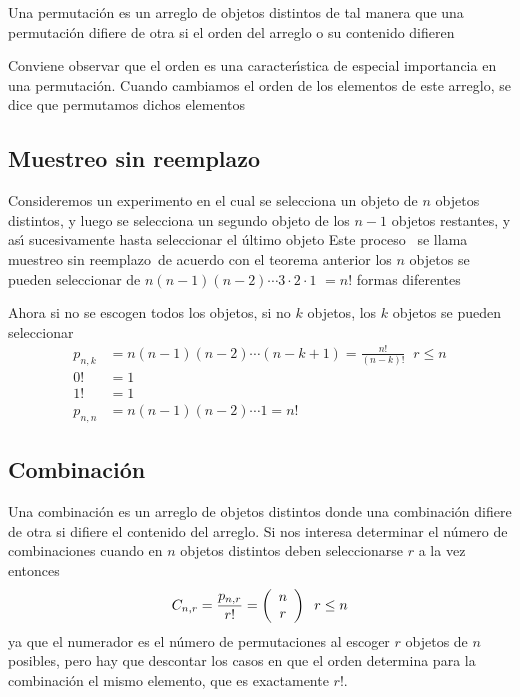 \begin{definition}
Una permutaci\'{o}n es un arreglo de objetos distintos de tal manera que una
permutaci\'{o}n difiere de otra si el orden del arreglo o su contenido
difieren
\end{definition} 

Conviene observar que el orden es una caracter\'{\i}stica de especial
importancia en una permutaci\'{o}n. Cuando cambiamos el orden de los elementos
de este arreglo, se dice que permutamos dichos elementos

\subsection{Muestreo sin reemplazo}

Consideremos un experimento en el cual se selecciona un objeto de $n$ objetos
distintos, y luego se selecciona un segundo objeto de los $n-1$ objetos
restantes, y as\'{\i} sucesivamente hasta seleccionar el \'{u}ltimo objeto
Este proceso \ se llama muestreo sin reemplazo\ de acuerdo con el teorema
anterior los $n$ objetos se pueden seleccionar de $n\left(  n-1\right)
\left(  n-2\right)  \cdots3\cdot2\cdot1$ $=n!$ formas diferentes\ 

Ahora si no se escogen todos los objetos, si no $k$ objetos, los $k$ objetos
se pueden seleccionar
\begin{align*}
p_{n,k}  &  =n\left(  n-1\right)  \left(  n-2\right)  \cdots\left(
n-k+1\right)  =\frac{n!}{\left(  n-k\right)  !}\;\;r\leq n\\
0!  &  =1\\
1!  &  =1\\
p_{n,n}  &  =n\left(  n-1\right)  \left(  n-2\right)  \cdots1=n!
\end{align*}

\subsection{Combinaci\'{o}n}

Una combinaci\'{o}n es un arreglo de objetos distintos donde una
combinaci\'{o}n difiere de otra si difiere el contenido del arreglo. Si nos
interesa determinar el n\'{u}mero de combinaciones cuando en $n$ objetos
distintos deben seleccionarse $r$ a la vez entonces
\[
C_{n,r}=\frac{p_{n,r}}{r!}=\left(
\begin{array}
[c]{c}%
n\\
r
\end{array}
\right)  \;\;r\leq n
\]
ya que el numerador es el n\'{u}mero de permutaciones al escoger $r$ objetos
de $n$ posibles, pero hay que descontar los casos en que el orden determina
para la combinaci\'{o}n el mismo elemento, que es exactamente $r!.$


